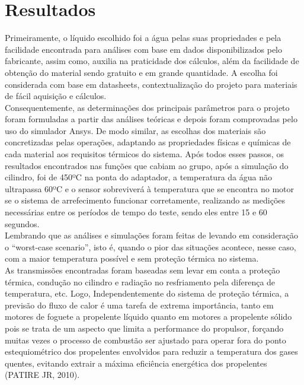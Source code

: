 \section{Resultados}
Primeiramente, o líquido escolhido foi a água pelas suas propriedades e pela facilidade encontrada para análises com base em dados disponibilizados pelo fabricante, assim como, auxilia na praticidade dos cálculos, além da facilidade de obtenção do material sendo gratuito e em grande quantidade. A escolha foi considerada com base em datasheets, contextualização do projeto para materiais de fácil aquisição e cálculos.\\
Consequentemente, as determinações dos principais parâmetros para o projeto foram formuladas a partir das análises teóricas e depois foram comprovadas pelo uso do simulador Ansys. De modo similar, as escolhas dos materiais são concretizadas pelas operações, adaptando as propriedades físicas e químicas de cada material aos requisitos térmicos do sistema.
Após todos esses passos, os resultados encontrados nas funções que cabiam ao grupo, após a simulação do cilindro, foi de 450ºC na ponta do adaptador, a temperatura da água não ultrapassa 60ºC e o sensor sobreviverá à temperatura que se encontra no motor se o sistema de arrefecimento funcionar corretamente, realizando as medições necessárias entre os períodos de tempo do teste, sendo eles entre 15 e 60 segundos.\\ Lembrando que as análises e simulações foram feitas de levando em consideração o “worst-case scenario”, isto é, quando o pior das situações acontece, nesse caso, com a maior temperatura possível e sem proteção térmica no sistema.\\
As transmissões encontradas foram baseadas sem levar em conta a proteção térmica, condução no cilindro e radiação no resfriamento pela diferença de temperatura, etc. Logo, Independentemente do sistema de proteção térmica, a previsão do fluxo de calor é uma tarefa de extrema importância, tanto em motores de foguete a propelente líquido quanto em motores a propelente sólido pois se trata de um aspecto que limita a performance do propulsor, forçando muitas vezes o processo de combustão ser ajustado para operar fora do ponto estequiométrico dos propelentes envolvidos para reduzir a temperatura dos gases quentes, evitando extrair a máxima eficiência energética dos propelentes (PATIRE JR, 2010). 

%          
